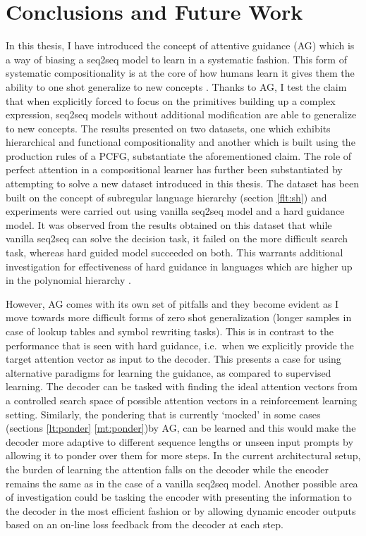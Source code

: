\chapter{Conclusions and Future Work} \label{Chapter:conclusion}%
In this thesis, I have introduced the concept of attentive guidance (AG) which is a way of biasing a seq2seq model to learn in a systematic fashion. This form of systematic compositionality is at the core of how humans learn \citep{marcus2003algebraic} it gives them the ability to one shot generalize to new concepts \citep{Lake2016}. Thanks to AG, I test the claim that when explicitly forced to focus on the primitives building up a complex expression, seq2seq models without additional modification are able to generalize to new concepts. The results presented on two datasets, one which exhibits hierarchical and functional compositionality and another which is built using the production rules of a PCFG, substantiate the aforementioned claim. The role of perfect attention in a compositional learner has further been substantiated by attempting to solve a new dataset introduced in this thesis. The dataset has been built on the concept of subregular language hierarchy (section \ref{flt:sh}) and experiments were carried out using vanilla seq2seq model and a hard guidance model. It was observed from the results obtained on this dataset that while vanilla seq2seq can solve the decision task, it failed on the more difficult search task, whereas hard guided model succeeded on both. This warrants additional investigation for effectiveness of hard guidance in languages which are higher up in the polynomial hierarchy \citep{arora2009computational}. 

However, AG comes with its own set of pitfalls and they become evident as I move towards more difficult forms of zero shot generalization (longer samples in case of lookup tables and symbol rewriting tasks). This is in contrast to the performance that is seen with hard guidance, i.e.\ when we explicitly provide the target attention vector as input to the decoder. This presents a case for using alternative paradigms for learning the guidance, as compared to supervised learning. The decoder can be tasked with finding the ideal attention vectors from a controlled search space of possible attention vectors in a reinforcement learning \citep{sutton2018reinforcement} setting. Similarly, the pondering that is currently \lq mocked\rq{} in some cases (sections \ref{lt:ponder} \ref{mt:ponder})by AG, can be learned and this would make the decoder more adaptive to different sequence lengths or unseen input prompts by allowing it to ponder over them for more steps. In the current architectural setup, the burden of learning the attention falls on the decoder while the encoder remains the same as in the case of a vanilla seq2seq model. Another possible area of investigation could be tasking the encoder with presenting the information to the decoder in the most efficient fashion or by allowing dynamic encoder outputs based on an on-line loss feedback from the decoder at each step. 

